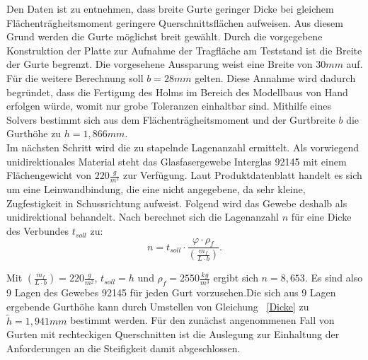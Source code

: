 \noindent Den Daten ist zu entnehmen, dass breite Gurte geringer Dicke bei gleichem Flächenträgheitsmoment geringere Querschnittsflächen aufweisen. Aus diesem Grund werden die Gurte möglichst breit gewählt. Durch die vorgegebene Konstruktion der Platte zur Aufnahme der Tragfläche am Teststand ist die Breite der Gurte begrenzt. Die vorgesehene Aussparung weist eine Breite von $ 30mm $ auf. Für die weitere Berechnung soll $ b=28mm $ gelten. Diese Annahme wird dadurch begründet, dass die Fertigung des Holms im Bereich des Modellbaus von Hand erfolgen würde, womit nur grobe Toleranzen einhaltbar sind.
Mithilfe eines Solvers bestimmt sich aus dem Flächenträgheitsmoment und der Gurtbreite $ b $ die Gurthöhe zu $ h=1,866mm $.\\
\noindent Im nächsten Schritt wird die zu stapelnde Lagenanzahl ermittelt. Als vorwiegend unidirektionales Material steht das Glasfasergewebe Interglas 92145 mit einem Flächengewicht von $ 220\frac{g}{m^{2}} $ zur Verfügung. Laut Produktdatenblatt \cite{item17} handelt es sich um eine Leinwandbindung, die eine nicht angegebene, da sehr kleine, Zugfestigkeit in Schussrichtung aufweist. Folgend wird das Gewebe deshalb als unidirektional behandelt. Nach \cite{item3} berechnet sich die Lagenanzahl $ n $ für eine Dicke des Verbundes $ t_{soll} $ zu:\\

\begin{equation}\label{Dicke}
	n=t_{soll}\cdot \frac{\varphi\cdot\rho_{f}}{\left(\frac{m_{f}}{L\cdot b}\right)}.
\end{equation}

\noindent Mit $ \left(\frac{m_{f}}{L\cdot b}\right) = 220\frac{g}{m^{2}} $, $ t_{soll}=h $ und $ \rho_{f}=2550\frac{kg}{m^{3}} $ ergibt sich $ n=8,653 $. Es sind also 9 Lagen des Gewebes 92145 für jeden Gurt vorzusehen.Die sich aus 9 Lagen ergebende Gurthöhe kann durch Umstellen von Gleichung ~\ref{Dicke} zu $ \tilde{h}=1,941mm $ bestimmt werden. Für den zunächst angenommenen Fall von Gurten mit rechteckigen Querschnitten ist die Auslegung zur Einhaltung der Anforderungen an die Steifigkeit damit abgeschlossen.\\


